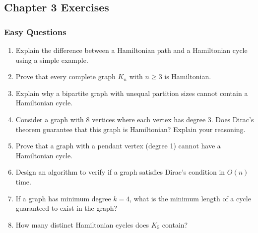 \documentclass{article}
\theoremstyle{definition}
\begin{document}
\pagebreak
\newpage

\subsection{Chapter 3 Exercises}

\subsubsection{Easy Questions}
\begin{enumerate}
\item Explain the difference between a Hamiltonian path and a Hamiltonian cycle using a simple example.

\item Prove that every complete graph $K_n$ with $n \geq 3$ is Hamiltonian.

\item Explain why a bipartite graph with unequal partition sizes cannot contain a Hamiltonian cycle.

\item Consider a graph with 8 vertices where each vertex has degree 3. Does Dirac's theorem guarantee that this graph is Hamiltonian? Explain your reasoning.

\item Prove that a graph with a pendant vertex (degree 1) cannot have a Hamiltonian cycle.

\item Design an algorithm to verify if a graph satisfies Dirac's condition in $O(n)$ time.

\item If a graph has minimum degree $k=4$, what is the minimum length of a cycle guaranteed to exist in the graph?

\item How many distinct Hamiltonian cycles does $K_5$ contain?
\end{enumerate}
\end{document}
